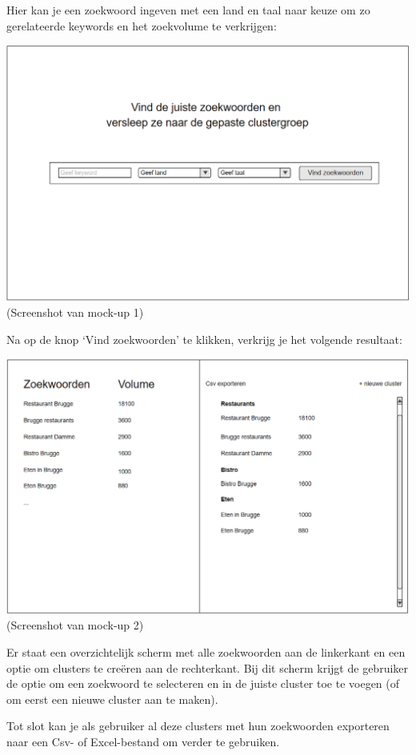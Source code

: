 Hier kan je een zoekwoord ingeven met een land en taal naar keuze om zo gerelateerde keywords en het zoekvolume te verkrijgen: 

\includegraphics[width=\linewidth]{Bachelorproef/bachelor/img/Mockup.png}
(Screenshot van mock-up 1)

Na op de knop ‘Vind zoekwoorden’ te klikken, verkrijg je het volgende resultaat: 

\includegraphics[width=\linewidth]{Bachelorproef/bachelor/img/Mockup2.png}
(Screenshot van mock-up 2)

Er staat een overzichtelijk scherm met alle zoekwoorden aan de linkerkant en een optie om clusters te creëren aan de rechterkant. Bij dit scherm krijgt de gebruiker de optie om een zoekwoord te selecteren en in de juiste cluster toe te voegen (of om eerst een nieuwe cluster aan te maken). 

Tot slot kan je als gebruiker al deze clusters met hun zoekwoorden exporteren naar een Csv- of Excel-bestand om verder te gebruiken. 

